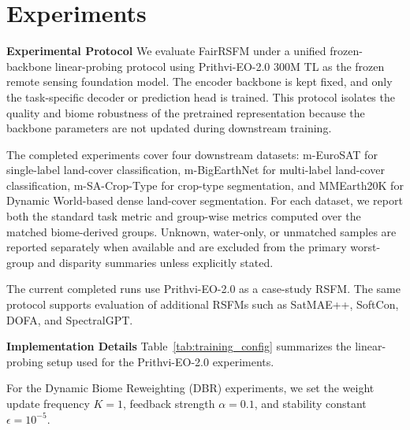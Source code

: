 \documentclass[10pt,twocolumn,letterpaper]{article}
\newcommand{\method}{FairRSFM\xspace}
\begin{document}
\section{Experiments}

\noindent \textbf{Experimental Protocol}
We evaluate \method under a unified frozen-backbone linear-probing protocol using Prithvi-EO-2.0 300M TL as the frozen remote sensing foundation model. The encoder backbone is kept fixed, and only the task-specific decoder or prediction head is trained. This protocol isolates the quality and biome robustness of the pretrained representation because the backbone parameters are not updated during downstream training.

The completed experiments cover four downstream datasets: m-EuroSAT for single-label land-cover classification, m-BigEarthNet for multi-label land-cover classification, m-SA-Crop-Type for crop-type segmentation, and MMEarth20K for Dynamic World-based dense land-cover segmentation. For each dataset, we report both the standard task metric and group-wise metrics computed over the matched biome-derived groups. Unknown, water-only, or unmatched samples are reported separately when available and are excluded from the primary worst-group and disparity summaries unless explicitly stated.

The current completed runs use Prithvi-EO-2.0 as a case-study RSFM. The same protocol supports evaluation of additional RSFMs such as SatMAE++, SoftCon, DOFA, and SpectralGPT.

\noindent \textbf{Implementation Details} Table~\ref{tab:training_config} summarizes the linear-probing setup used for the Prithvi-EO-2.0 experiments.

For the Dynamic Biome Reweighting (DBR) experiments, we set the weight update frequency $K=1$, feedback strength $\alpha=0.1$, and stability constant $\epsilon=10^{-5}$.

\begin{table}[t]
\centering \small
\caption{Prithvi-EO-2.0 linear-probing setup used in the current experiments.}
\label{tab:training_config}
\end{table}
\end{document}
